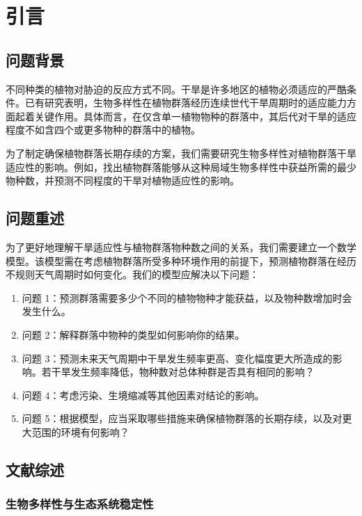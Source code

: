 \documentclass[11pt,a4paper]{ctexart}
\begin{document}
\newpage
\pagestyle{fancy}

\section{引言}

\subsection{问题背景}

不同种类的植物对胁迫的反应方式不同。干旱是许多地区的植物必须适应的严酷条件。已有研究表明，生物多样性在植物群落经历连续世代干旱周期时的适应能力方面起着关键作用。具体而言，在仅含单一植物物种的群落中，其后代对干旱的适应程度不如含四个或更多物种的群落中的植物。

为了制定确保植物群落长期存续的方案，我们需要研究生物多样性对植物群落干旱适应性的影响。例如，找出植物群落能够从这种局域生物多样性中获益所需的最少物种数，并预测不同程度的干旱对植物适应性的影响。

\subsection{问题重述}

为了更好地理解干旱适应性与植物群落物种数之间的关系，我们需要建立一个数学模型。该模型需在考虑植物群落所受多种环境作用的前提下，预测植物群落在经历不规则天气周期时如何变化。我们的模型应解决以下问题：

\begin{enumerate}
\item 问题 1：预测群落需要多少个不同的植物物种才能获益，以及物种数增加时会发生什么。
\item 问题 2：解释群落中物种的类型如何影响你的结果。
\item 问题 3：预测未来天气周期中干旱发生频率更高、变化幅度更大所造成的影响。若干旱发生频率降低，物种数对总体种群是否具有相同的影响？
\item 问题 4：考虑污染、生境缩减等其他因素对结论的影响。
\item 问题 5：根据模型，应当采取哪些措施来确保植物群落的长期存续，以及对更大范围的环境有何影响？
\end{enumerate}

\subsection{文献综述}

\subsubsection{生物多样性与生态系统稳定性}
\end{document}
